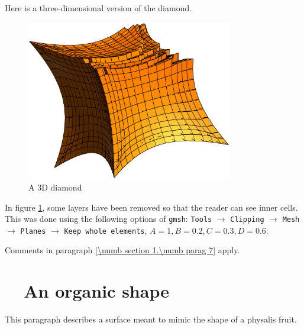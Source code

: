Here is a three-dimensional version of the diamond.

\begin{figure}[ht] \centering
  \includegraphics[width=90mm]{cube-star}
  \caption{A 3D diamond}
  \label{\numb section 2.\numb fig 13}
\end{figure}

In figure \ref{\numb section 2.\numb fig 13}, some layers have been removed so that the reader
can see inner cells.
This was done using the following options of {\small\tt gmsh}: {\small\tt Tools} $\to$
{\small\tt Clipping} $\to$ {\small\tt Mesh} $\to$ {\small\tt Planes} $\to$
{\small\tt Keep whole elements}, $ A = 1, B = 0.2, C = 0.3, D = 0.6 $.

Comments in paragraph \ref{\numb section 1.\numb parag 7} apply.


\section{~~An organic shape}\label{\numb section 2.\numb parag 14}

This paragraph describes a surface meant to mimic the shape of a physalis fruit.


